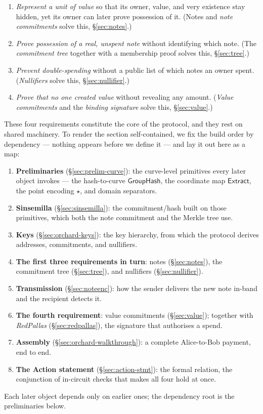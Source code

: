 \documentclass[11pt,a4paper]{article}
\theoremstyle{definition}
\newcommand{\Extract}{\ensuremath{\mathsf{Extract}}}
\newcommand{\GroupHash}{\ensuremath{\mathsf{GroupHash}}}
\begin{document}
\begin{enumerate}[leftmargin=*]
\item \emph{Represent a unit of value} so that its owner, value, and very existence
stay hidden, yet its owner can later prove possession of it. (Notes and
\emph{note commitments} solve this, \S\ref{sec:notes}.)
\item \emph{Prove possession of a real, unspent note} without identifying which
note. (The \emph{commitment tree} together with a membership proof solves this,
\S\ref{sec:tree}.)
\item \emph{Prevent double-spending} without a public list of which notes
an owner spent. (\emph{Nullifiers} solve this, \S\ref{sec:nullifier}.)
\item \emph{Prove that no one created value} without revealing any amount.
(\emph{Value commitments} and the \emph{binding signature} solve this,
\S\ref{sec:value}.)
\end{enumerate}

These four requirements constitute the core of the protocol, and they rest on shared
machinery. To render the section self-contained, we fix the build
order by dependency --- nothing appears before we define it --- and lay it
out here as a map:
\begin{enumerate}[leftmargin=*]
\item \textbf{Preliminaries} (\S\ref{sec:prelim-curve}): the curve-level
primitives every later object invokes --- the hash-to-curve $\GroupHash$, the
coordinate map $\Extract$, the point encoding $\star$, and domain
separators.
\item \textbf{Sinsemilla} (\S\ref{sec:sinsemilla}): the commitment/hash
built on those primitives, which both the note commitment and the Merkle
tree use.
\item \textbf{Keys} (\S\ref{sec:orchard-keys}): the key hierarchy, from
which the protocol derives addresses, commitments, and nullifiers.
\item \textbf{The first three requirements in turn}: notes
(\S\ref{sec:notes}), the commitment tree (\S\ref{sec:tree}), and nullifiers
(\S\ref{sec:nullifier}).
\item \textbf{Transmission} (\S\ref{sec:noteenc}): how the sender delivers
the new note in-band and the recipient detects it.
\item \textbf{The fourth requirement}: value commitments
(\S\ref{sec:value}); together with \emph{RedPallas}
(\S\ref{sec:redpallas}), the signature that authorises a spend.
\item \textbf{Assembly} (\S\ref{sec:orchard-walkthrough}): a complete Alice-to-Bob
payment, end to end.
\item \textbf{The Action statement} (\S\ref{sec:action-stmt}): the formal
relation, the conjunction of in-circuit checks that makes all four hold at
once.
\end{enumerate}
Each later object depends only on earlier ones; the dependency root is the
preliminaries below.
\end{document}
